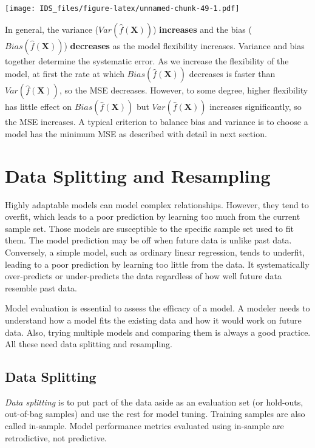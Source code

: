 \documentclass[
  12pt,
]{krantz}
\begin{document}
\texttt{[image: IDS\_files/figure-latex/unnamed-chunk-49-1.pdf]}

In general, the variance (\(Var(\hat{f}(\mathbf{X}))\)) \textbf{increases} and the bias (\(Bias(\hat{f}(\mathbf{X}))\)) \textbf{decreases} as the model flexibility increases. Variance and bias together determine the systematic error. As we increase the flexibility of the model, at first the rate at which \(Bias(\hat{f}(\mathbf{X}))\) decreases is faster than \(Var (\hat{f} (\mathbf{X}))\), so the MSE decreases. However, to some degree, higher flexibility has little effect on \(Bias(\hat{f}(\mathbf{X}))\) but \(Var(\hat{f} (\mathbf{X}))\) increases significantly, so the MSE increases. A typical criterion to balance bias and variance is to choose a model has the minimum MSE as described with detail in next section.

\hypertarget{datasplittingresampling}{%
\section{Data Splitting and Resampling}\label{datasplittingresampling}}

Highly adaptable models can model complex relationships. However, they tend to overfit, which leads to a poor prediction by learning too much from the current sample set. Those models are susceptible to the specific sample set used to fit them. The model prediction may be off when future data is unlike past data. Conversely, a simple model, such as ordinary linear regression, tends to underfit, leading to a poor prediction by learning too little from the data. It systematically over-predicts or under-predicts the data regardless of how well future data resemble past data.

Model evaluation is essential to assess the efficacy of a model. A modeler needs to understand how a model fits the existing data and how it would work on future data. Also, trying multiple models and comparing them is always a good practice. All these need data splitting and resampling.

\hypertarget{datasplitting}{%
\subsection{Data Splitting}\label{datasplitting}}

\emph{Data splitting} is to put part of the data aside as an evaluation set (or hold-outs, out-of-bag samples) and use the rest for model tuning. Training samples are also called in-sample. Model performance metrics evaluated using in-sample are retrodictive, not predictive.
\end{document}
